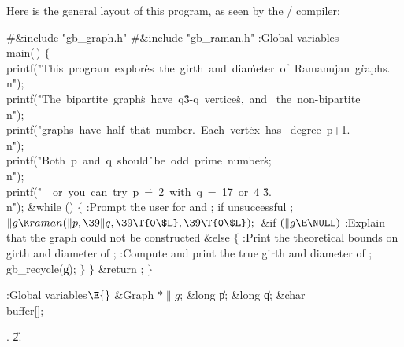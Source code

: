\fi

Here is the general layout of this program, as seen by the \CEE/ compiler:

\Y\B\8\#\&{include} \.{"gb\_graph.h"}\6
\8\#\&{include} \.{"gb\_raman.h"}\6
\ATH\7
:Global variables\X\7
\\{main}(\,)\1\1\2\2\6
${}\{{}$\1\6
\\{printf}(\.{"This\ program\ explor}\)\.{es\ the\ girth\ and\ dia}\)\.{meter\
of\ Ramanujan\ g}\)\.{raphs.\\n"});\6
\\{printf}(\.{"The\ bipartite\ graph}\)\.{s\ have\ q\^3-q\ vertice}\)\.{s,\ and%
\ the\ non-bipar}\)\.{tite\\n"});\6
\\{printf}(\.{"graphs\ have\ half\ th}\)\.{at\ number.\ Each\ vert}\)\.{ex\ has%
\ degree\ p+1.\\n}\)\.{"});\6
\\{printf}(\.{"Both\ p\ and\ q\ should}\)\.{\ be\ odd\ prime\ number}\)\.{s;%
\\n"});\6
\\{printf}(\.{"\ \ or\ you\ can\ try\ p\ }\)\.{=\ 2\ with\ q\ =\ 17\ or\ 4}\)%
\.{3.\\n"});\6
\&{while} ()\5
${}\{{}$\1\6
:Prompt the user for  and ;  if unsuccessful%
\X;\6
${}\|g\K\\{raman}(\|p,\39\|q,\39\T{0\$L},\39\T{0\$L});{}$\6
\&{if} ${}(\|g\E\NULL){}$\1\5
:Explain that the graph could not be constructed\X\2\6
\&{else}\5
${}\{{}$\1\6
:Print the theoretical bounds on girth and diameter of \X;\6
\X12:Compute and print the true girth and diameter of \PB{\|g}\X;\6
\\{gb\_recycle}(\|g);\6
\4${}\}{}$\2\6
\4${}\}{}$\2\6
\&{return} ;\6
\4${}\}{}$\2\par
\fi

\B{}:Global variables\X${}\E{}$\6
\&{Graph} ${}{*}\|g{}$;\6
\&{long} \|p;\6
\&{long} \|q;\6
\&{char} \\{buffer}[];\par
\A11.
\U2.\fi

